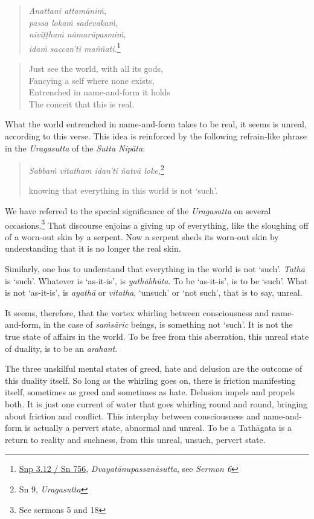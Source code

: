 \begin{quote}
\emph{Anattani attamāniṁ,}\\
\emph{passa lokaṁ sadevakaṁ,}\\
\emph{niviṭṭhaṁ nāmarūpasmiṁ,}\\
\emph{idaṁ saccan'ti maññati.}\footnote{\href{https://suttacentral.net/snp3.12/pli/ms}{Snp 3.12 / Sn 756}, \emph{Dvayatānupassanāsutta}, see \emph{Sermon 6}}
\end{quote}

\begin{quote}
Just see the world, with all its gods,\\
Fancying a self where none exists,\\
Entrenched in name-and-form it holds\\
The conceit that this is real.
\end{quote}

What the world entrenched in name-and-form takes to be real, it seems is unreal, according to this verse. This idea is reinforced by the following refrain-like phrase in the \emph{Uragasutta} of the \emph{Sutta Nipāta}:

\begin{quote}
\emph{Sabbaṁ vitatham idan'ti ñatvā loke,}\footnote{Sn 9, \emph{Uragasutta}}

knowing that everything in this world is not `such'.
\end{quote}

We have referred to the special significance of the \emph{Uragasutta} on several occasions.\footnote{See sermons 5 and 18} That discourse enjoins a giving up of everything, like the sloughing off of a worn-out skin by a serpent. Now a serpent sheds its worn-out skin by understanding that it is no longer the real skin.

Similarly, one has to understand that everything in the world is not `such'. \emph{Tathā} is `such'. Whatever is `as-it-is', is \emph{yathābhūta}. To be `as-it-is', is to be `such'. What is not `as-it-is', is \emph{ayathā} or \emph{vitatha}, `unsuch' or `not such', that is to say, unreal.

It seems, therefore, that the vortex whirling between consciousness and name-and-form, in the case of \emph{saṁsāric} beings, is something not `such'. It is not the true state of affairs in the world. To be free from this aberration, this unreal state of duality, is to be an \emph{arahant}.

The three unskilful mental states of greed, hate and delusion are the outcome of this duality itself. So long as the whirling goes on, there is friction manifesting itself, sometimes as greed and sometimes as hate. Delusion impels and propels both. It is just one current of water that goes whirling round and round, bringing about friction and conflict. This interplay between consciousness and name-and-form is actually a pervert state, abnormal and unreal. To be a Tathāgata is a return to reality and suchness, from this unreal, unsuch, pervert state.

